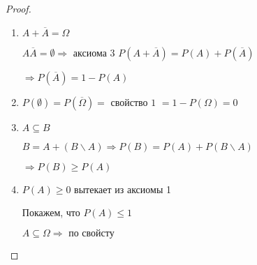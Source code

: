 \documentclass[a4paper, 14pt]{report}
\begin{document}
\begin{proof}
    \begin{enumerate}
        \item $A + \overline{A} = \Omega$

            $A \overline{A} = \emptyset \Rightarrow \text{ аксиома 3 } P(A + \overline{A}) = P(A) + P(\overline{A})$

            $\Rightarrow P(\overline{A}) = 1 - P(A)$

        \item $P(\emptyset) = P(\overline{\Omega}) = \text{ свойство 1 } = 1 - P(\Omega) = 0$

        \item $A \subseteq B$

            $B = A + (B \backslash A) \Rightarrow P(B) = P(A) + P(B \backslash A)$

            $\Rightarrow P(B) \geq P(A)$

        \item $P(A) \geq 0$ вытекает из аксиомы 1

            Покажем, что $P(A) \le 1$

            $A \subseteq \Omega \Rightarrow \text{ по свойсту}$
    \end{enumerate}
\end{proof}
\end{document}
